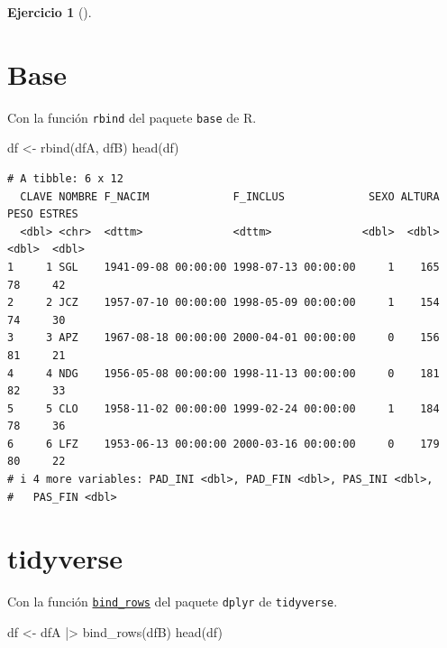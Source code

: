 \documentclass[
  spanish,
  a4paper,
]{scrreport}
\newenvironment{Shaded}{\begin{snugshade}}{\end{snugshade}}
\newcommand{\FunctionTok}[1]{\textcolor[rgb]{0.28,0.35,0.67}{#1}}
\newcommand{\NormalTok}[1]{\textcolor[rgb]{0.00,0.23,0.31}{#1}}
\newcommand{\OtherTok}[1]{\textcolor[rgb]{0.00,0.23,0.31}{#1}}
\newcommand{\SpecialCharTok}[1]{\textcolor[rgb]{0.37,0.37,0.37}{#1}}
\theoremstyle{definition}
\newtheorem{exercise}{Ejercicio}[chapter]
\theoremstyle{remark}
\begin{document}
\begin{exercise}[]
\begin{enumerate}
\begin{tcolorbox}
  \section{Base}

  Con la función \texttt{rbind} del paquete \texttt{base} de R.

\begin{Shaded}
\begin{Highlighting}[]
\NormalTok{df }\OtherTok{\textless{}{-}} \FunctionTok{rbind}\NormalTok{(dfA, dfB)}
\FunctionTok{head}\NormalTok{(df)}
\end{Highlighting}
\end{Shaded}

\begin{verbatim}
# A tibble: 6 x 12
  CLAVE NOMBRE F_NACIM             F_INCLUS             SEXO ALTURA  PESO ESTRES
  <dbl> <chr>  <dttm>              <dttm>              <dbl>  <dbl> <dbl>  <dbl>
1     1 SGL    1941-09-08 00:00:00 1998-07-13 00:00:00     1    165    78     42
2     2 JCZ    1957-07-10 00:00:00 1998-05-09 00:00:00     1    154    74     30
3     3 APZ    1967-08-18 00:00:00 2000-04-01 00:00:00     0    156    81     21
4     4 NDG    1956-05-08 00:00:00 1998-11-13 00:00:00     0    181    82     33
5     5 CLO    1958-11-02 00:00:00 1999-02-24 00:00:00     1    184    78     36
6     6 LFZ    1953-06-13 00:00:00 2000-03-16 00:00:00     0    179    80     22
# i 4 more variables: PAD_INI <dbl>, PAD_FIN <dbl>, PAS_INI <dbl>,
#   PAS_FIN <dbl>
\end{verbatim}

  \section{tidyverse}

  Con la función
  \href{https://dplyr.tidyverse.org/reference/bind.html}{\texttt{bind\_rows}}
  del paquete \texttt{dplyr} de \texttt{tidyverse}.

\begin{Shaded}
\begin{Highlighting}[]
\NormalTok{df }\OtherTok{\textless{}{-}}\NormalTok{ dfA }\SpecialCharTok{|\textgreater{}} \FunctionTok{bind\_rows}\NormalTok{(dfB)}
\FunctionTok{head}\NormalTok{(df)}
\end{Highlighting}
\end{Shaded}


\end{tcolorbox}
\end{enumerate}
\end{exercise}
\end{document}
